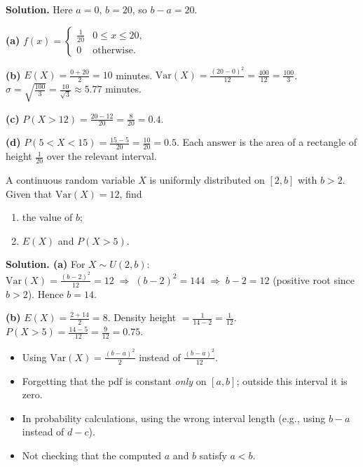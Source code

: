 \documentclass[11pt]{article}
\begin{document}
\begin{exoresolu}
\textbf{Solution.} Here $a = 0$, $b = 20$, so $b-a = 20$.

\textbf{(a)} $f(x) = \begin{cases} \frac{1}{20} & 0 \leq x \leq 20, \\ 0 & \text{otherwise.} \end{cases}$

\textbf{(b)} $E(X) = \frac{0+20}{2} = 10$ minutes.
$\mathrm{Var}(X) = \frac{(20-0)^{2}}{12} = \frac{400}{12} = \frac{100}{3}$.
$\sigma = \sqrt{\frac{100}{3}} = \frac{10}{\sqrt{3}} \approx 5.77$ minutes.

\textbf{(c)} $P(X > 12) = \frac{20-12}{20} = \frac{8}{20} = 0.4$.

\textbf{(d)} $P(5 < X < 15) = \frac{15-5}{20} = \frac{10}{20} = 0.5$.
Each answer is the area of a rectangle of height $\frac{1}{20}$ over the relevant interval.
\end{exoresolu}

\begin{exemplebox}
A continuous random variable $X$ is uniformly distributed on $[2, b]$ with $b > 2$. Given that $\mathrm{Var}(X) = 12$, find
\begin{enumerate}
\item[(a)] the value of $b$;
\item[(b)] $E(X)$ and $P(X > 5)$.
\end{enumerate}
\end{exemplebox}

\begin{exoresolu}
\textbf{Solution. (a)} For $X \sim U(2, b)$:
$\mathrm{Var}(X) = \frac{(b-2)^{2}}{12} = 12 \;\Longrightarrow\; (b-2)^{2} = 144 \;\Longrightarrow\; b-2 = 12$ (positive root since $b>2$).
Hence $\boxed{b = 14}$.

\textbf{(b)} $E(X) = \frac{2+14}{2} = 8$.
Density height $= \frac{1}{14-2} = \frac{1}{12}$.
$P(X > 5) = \frac{14-5}{12} = \frac{9}{12} = 0.75$.
\end{exoresolu}

\begin{attention}
\begin{itemize}
\item Using $\mathrm{Var}(X) = \frac{(b-a)^{2}}{2}$ instead of $\frac{(b-a)^{2}}{12}$.
\item Forgetting that the pdf is constant \emph{only} on $[a,b]$; outside this interval it is zero.
\item In probability calculations, using the wrong interval length (e.g., using $b-a$ instead of $d-c$).
\item Not checking that the computed $a$ and $b$ satisfy $a < b$.
\end{itemize}
\end{attention}
\end{document}
